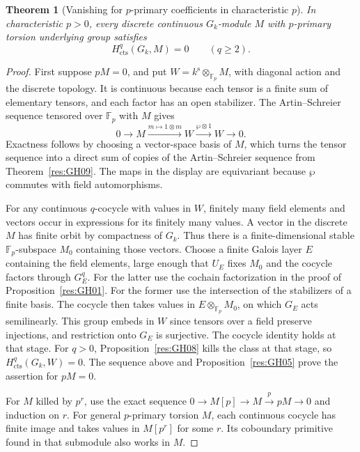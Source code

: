 \documentclass[11pt,oneside,openany]{book}
\newtheorem{theorem}{Theorem}[chapter]
\theoremstyle{definition}
\theoremstyle{remark}
\begin{document}
\begin{theorem}[Vanishing for \(p\)-primary coefficients in characteristic \(p\)]
\label{res:GH10}
In characteristic \(p>0\), every discrete continuous \(G_k\)-module
\(M\) with \(p\)-primary torsion underlying group satisfies
\[
 H^q_{\mathrm{cts}}(G_k,M)=0\qquad(q\geq2).
\]
\end{theorem}
\begin{proof}
First suppose \(pM=0\), and put
\(W=k^{\mathrm s}\otimes_{\mathbb F_p}M\), with diagonal action and
the discrete topology. It is continuous because each tensor is a
finite sum of elementary tensors, and each factor has an open
stabilizer. The Artin--Schreier sequence tensored over \(\mathbb F_p\)
with \(M\) gives
\[
 0\longrightarrow M\xrightarrow{m\mapsto 1\otimes m}W
 \xrightarrow{\wp\otimes 1}W\longrightarrow0.
\]
Exactness follows by choosing a vector-space basis of \(M\), which
turns the tensor sequence into a direct sum of copies of the
Artin--Schreier sequence from Theorem~\ref{res:GH09}. The maps in the
display are equivariant because \(\wp\) commutes with field
automorphisms.

For any continuous \(q\)-cocycle with values in \(W\), finitely
many field elements and vectors occur in expressions for its
finitely many values. A vector in the discrete \(M\) has finite
orbit by compactness of \(G_k\). Thus there is a finite-dimensional
stable \(\mathbb F_p\)-subspace \(M_0\) containing those vectors.
Choose a finite Galois layer \(E\) containing the field elements,
large enough that \(U_E\) fixes \(M_0\) and the cocycle factors
through \(G_E^q\). For the latter use the cochain factorization in
the proof of Proposition~\ref{res:GH01}. For the former use the
intersection of the stabilizers of a finite basis. The cocycle
then takes values in \(E\otimes_{\mathbb F_p} M_0\), on which
\(G_E\) acts semilinearly. This group embeds in \(W\) since tensors
over a field preserve injections, and restriction onto \(G_E\)
is surjective. The cocycle identity holds at that stage. For
\(q>0\), Proposition~\ref{res:GH08} kills the class at that stage,
so \(H^q_{\mathrm{cts}}(G_k,W)=0\). The sequence above and
Proposition~\ref{res:GH05} prove the assertion for \(pM=0\).

For \(M\) killed by \(p^r\), use the exact sequence
\(0\to M[p]\to M\xrightarrow{p}pM\to0\) and induction on \(r\).
For general \(p\)-primary torsion \(M\), each continuous cocycle
has finite image and takes values in \(M[p^r]\) for some \(r\).
Its coboundary primitive found in that submodule also works in \(M\).
\end{proof}
\end{document}

